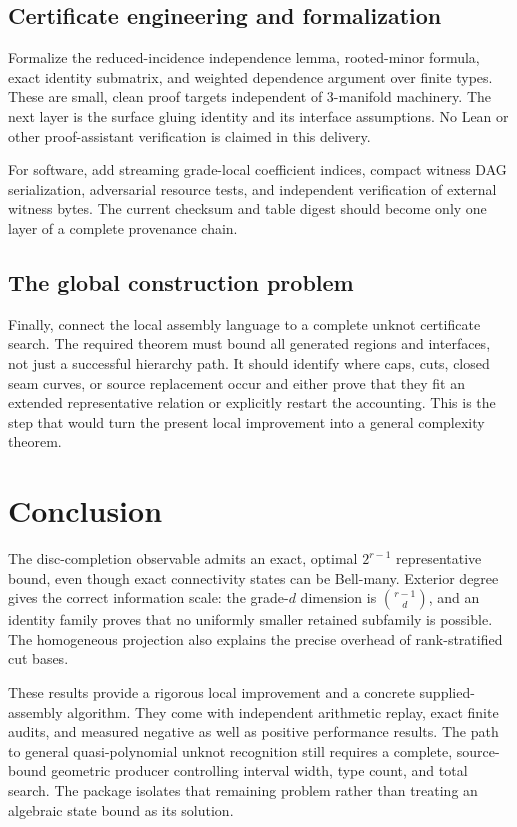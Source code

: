 \documentclass[11pt,a4paper]{article}
\theoremstyle{remark}\newtheorem{remark}[theorem]{Remark}
\begin{document}
\subsection{Certificate engineering and formalization}
Formalize the reduced-incidence independence lemma, rooted-minor formula, exact identity submatrix, and weighted dependence argument over finite types. These are small, clean proof targets independent of 3-manifold machinery. The next layer is the surface gluing identity and its interface assumptions. No Lean or other proof-assistant verification is claimed in this delivery.

For software, add streaming grade-local coefficient indices, compact witness DAG serialization, adversarial resource tests, and independent verification of external witness bytes. The current checksum and table digest should become only one layer of a complete provenance chain.

\subsection{The global construction problem}
Finally, connect the local assembly language to a complete unknot certificate search. The required theorem must bound all generated regions and interfaces, not just a successful hierarchy path. It should identify where caps, cuts, closed seam curves, or source replacement occur and either prove that they fit an extended representative relation or explicitly restart the accounting. This is the step that would turn the present local improvement into a general complexity theorem.

\section{Conclusion}
The disc-completion observable admits an exact, optimal $2^{r-1}$ representative bound, even though exact connectivity states can be Bell-many. Exterior degree gives the correct information scale: the grade-$d$ dimension is $\binom{r-1}{d}$, and an identity family proves that no uniformly smaller retained subfamily is possible. The homogeneous projection also explains the precise overhead of rank-stratified cut bases.

These results provide a rigorous local improvement and a concrete supplied-assembly algorithm. They come with independent arithmetic replay, exact finite audits, and measured negative as well as positive performance results. The path to general quasi-polynomial unknot recognition still requires a complete, source-bound geometric producer controlling interval width, type count, and total search. The package isolates that remaining problem rather than treating an algebraic state bound as its solution.
\end{document}
